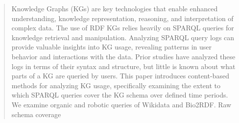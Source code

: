 \documentclass[sw]{iosart2x}
\providecommand{\DIFdelbegin}{} %
\providecommand{\DIFscaledelfig}{0.5}
\newlength{\DIFdelgraphicswidth} %
\newlength{\DIFdelgraphicsheight} %
\providecommand{\DIFdelincludegraphics}[2][]{%
\sbox{\DIFdelgraphicsbox}{\DIFOincludegraphics[#1]{#2}}%
\settoboxwidth{\DIFdelgraphicswidth}{\DIFdelgraphicsbox} %
\settoboxtotalheight{\DIFdelgraphicsheight}{\DIFdelgraphicsbox} %
\scalebox{\DIFscaledelfig}{%
\parbox[b]{\DIFdelgraphicswidth}{\usebox{\DIFdelgraphicsbox}\\[-\baselineskip] \rule{\DIFdelgraphicswidth}{0em}}\llap{\resizebox{\DIFdelgraphicswidth}{\DIFdelgraphicsheight}{%
\setlength{\unitlength}{\DIFdelgraphicswidth}%
\begin{picture}(1,1)%
\thicklines\linethickness{2pt} %
{\color[rgb]{1,0,0}\put(0,0){\framebox(1,1){}}}%
{\color[rgb]{1,0,0}\put(0,0){\line( 1,1){1}}}%
{\color[rgb]{1,0,0}\put(0,1){\line(1,-1){1}}}%
\end{picture}%
}\hspace*{3pt}}} %
} %
\DeclareRobustCommand{\DIFdelbegin}{\DIFOdelbegin \let\includegraphics\DIFdelincludegraphics} %
\begin{document}
\begin{frontmatter}
\begin{abstract}
Knowledge Graphs (KGs) are key technologies that enable enhanced understanding, knowledge representation, reasoning, and interpretation of complex data. The use of RDF KGs relies heavily on SPARQL queries for knowledge retrieval and manipulation. Analyzing SPARQL query logs can provide valuable insights into KG usage, revealing patterns in user behavior and interactions with the data. Prior studies have analyzed these logs in terms of their syntax and structure, but little is known about what parts of a KG are queried by users. This paper introduces content-based methods for analyzing KG usage, specifically examining the extent to which SPARQL queries cover the KG schema over defined time periods. We examine organic and robotic queries of Wikidata and Bio2RDF. Raw schema coverage
\DIFdelbegin %

\end{abstract}
\end{frontmatter}
\end{document}
